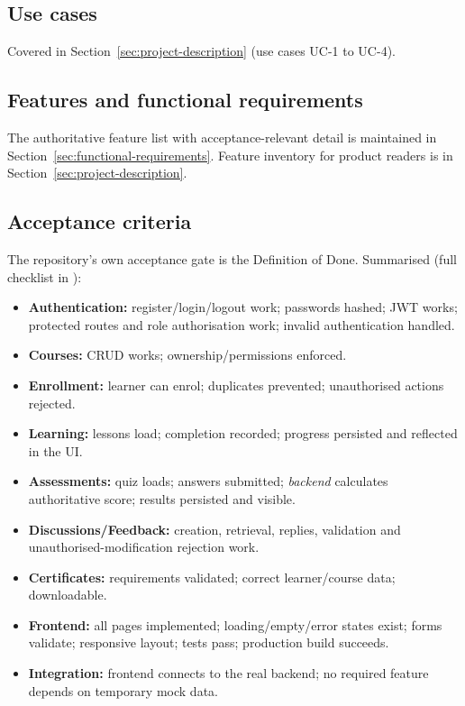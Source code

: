 \subsection{Use cases}
Covered in Section~\ref{sec:project-description} (use cases UC-1 to UC-4).

\subsection{Features and functional requirements}

The authoritative feature list with acceptance-relevant detail is maintained in Section~\ref{sec:functional-requirements}. Feature inventory for product readers is in Section~\ref{sec:project-description}.

\subsection{Acceptance criteria}

The repository's own acceptance gate is the Definition of Done. Summarised (full checklist in ):

\begin{itemize}
    \item \textbf{Authentication:} register/login/logout work; passwords hashed; JWT works; protected routes and role authorisation work; invalid authentication handled.
    \item \textbf{Courses:} CRUD works; ownership/permissions enforced.
    \item \textbf{Enrollment:} learner can enrol; duplicates prevented; unauthorised actions rejected.
    \item \textbf{Learning:} lessons load; completion recorded; progress persisted and reflected in the UI.
    \item \textbf{Assessments:} quiz loads; answers submitted; \emph{backend} calculates authoritative score; results persisted and visible.
    \item \textbf{Discussions/Feedback:} creation, retrieval, replies, validation and unauthorised-modification rejection work.
    \item \textbf{Certificates:} requirements validated; correct learner/course data; downloadable.
    \item \textbf{Frontend:} all pages implemented; loading/empty/error states exist; forms validate; responsive layout; tests pass; production build succeeds.
    \item \textbf{Integration:} frontend connects to the real backend; no required feature depends on temporary mock data.
\end{itemize}

